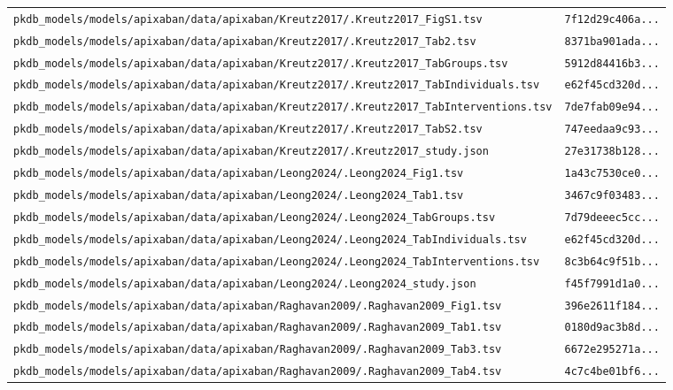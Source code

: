 \begin{longtable}{ll}
\texttt{pkdb\_models/models/apixaban/data/apixaban/Kreutz2017/.Kreutz2017\_FigS1.tsv} & \texttt{7f12d29c406a...} \\
\texttt{pkdb\_models/models/apixaban/data/apixaban/Kreutz2017/.Kreutz2017\_Tab2.tsv} & \texttt{8371ba901ada...} \\
\texttt{pkdb\_models/models/apixaban/data/apixaban/Kreutz2017/.Kreutz2017\_TabGroups.tsv} & \texttt{5912d84416b3...} \\
\texttt{pkdb\_models/models/apixaban/data/apixaban/Kreutz2017/.Kreutz2017\_TabIndividuals.tsv} & \texttt{e62f45cd320d...} \\
\texttt{pkdb\_models/models/apixaban/data/apixaban/Kreutz2017/.Kreutz2017\_TabInterventions.tsv} & \texttt{7de7fab09e94...} \\
\texttt{pkdb\_models/models/apixaban/data/apixaban/Kreutz2017/.Kreutz2017\_TabS2.tsv} & \texttt{747eedaa9c93...} \\
\texttt{pkdb\_models/models/apixaban/data/apixaban/Kreutz2017/.Kreutz2017\_study.json} & \texttt{27e31738b128...} \\
\texttt{pkdb\_models/models/apixaban/data/apixaban/Leong2024/.Leong2024\_Fig1.tsv} & \texttt{1a43c7530ce0...} \\
\texttt{pkdb\_models/models/apixaban/data/apixaban/Leong2024/.Leong2024\_Tab1.tsv} & \texttt{3467c9f03483...} \\
\texttt{pkdb\_models/models/apixaban/data/apixaban/Leong2024/.Leong2024\_TabGroups.tsv} & \texttt{7d79deeec5cc...} \\
\texttt{pkdb\_models/models/apixaban/data/apixaban/Leong2024/.Leong2024\_TabIndividuals.tsv} & \texttt{e62f45cd320d...} \\
\texttt{pkdb\_models/models/apixaban/data/apixaban/Leong2024/.Leong2024\_TabInterventions.tsv} & \texttt{8c3b64c9f51b...} \\
\texttt{pkdb\_models/models/apixaban/data/apixaban/Leong2024/.Leong2024\_study.json} & \texttt{f45f7991d1a0...} \\
\texttt{pkdb\_models/models/apixaban/data/apixaban/Raghavan2009/.Raghavan2009\_Fig1.tsv} & \texttt{396e2611f184...} \\
\texttt{pkdb\_models/models/apixaban/data/apixaban/Raghavan2009/.Raghavan2009\_Tab1.tsv} & \texttt{0180d9ac3b8d...} \\
\texttt{pkdb\_models/models/apixaban/data/apixaban/Raghavan2009/.Raghavan2009\_Tab3.tsv} & \texttt{6672e295271a...} \\
\texttt{pkdb\_models/models/apixaban/data/apixaban/Raghavan2009/.Raghavan2009\_Tab4.tsv} & \texttt{4c7c4be01bf6...} \\

\end{longtable}
